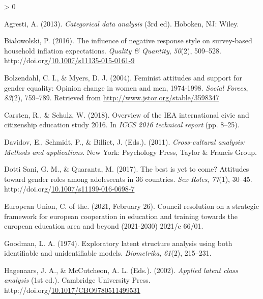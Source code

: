 \documentclass[12pt,a4paper,oneside]{reedthesis}
\newlength{\cslhangindent}
\newenvironment{CSLReferences}[2] %
 {%
  \setlength{\parindent}{0pt}
  \ifodd #1 \everypar{\setlength{\hangindent}{\cslhangindent}}\ignorespaces\fi
  \ifnum #2 > 0
  \setlength{\parskip}{#2\baselineskip}
  \fi
 }%
 {}
\begin{document}
\hypertarget{refs}{}
\begin{CSLReferences}{1}{0}
\leavevmode\hypertarget{ref-agresti_categorical_2013}{}%
Agresti, A. (2013). \emph{Categorical data analysis} (3rd ed). Hoboken, {NJ}: Wiley.

\leavevmode\hypertarget{ref-bialowolski_influence_2016}{}%
Białowolski, P. (2016). The influence of negative response style on survey-based household inflation expectations. \emph{Quality \& Quantity}, \emph{50}(2), 509--528. http://doi.org/\href{https://doi.org/10.1007/s11135-015-0161-9}{10.1007/s11135-015-0161-9}

\leavevmode\hypertarget{ref-bolzendahl_feminist_2004}{}%
Bolzendahl, C. I., \& Myers, D. J. (2004). Feminist attitudes and support for gender equality: Opinion change in women and men, 1974-1998. \emph{Social Forces}, \emph{83}(2), 759--789. Retrieved from \url{http://www.jstor.org/stable/3598347}

\leavevmode\hypertarget{ref-carsten_overview_2018}{}%
Carsten, R., \& Schulz, W. (2018). Overview of the {IEA} international civic and citizenship education study 2016. In \emph{{ICCS} 2016 technical report} (pp. 8--25).

\leavevmode\hypertarget{ref-davidov_cross-cultural_2011}{}%
Davidov, E., Schmidt, P., \& Billiet, J. (Eds.). (2011). \emph{Cross-cultural analysis: Methods and applications}. New York: Psychology Press, Taylor \& Francis Group.

\leavevmode\hypertarget{ref-dotti_sani_best_2017}{}%
Dotti Sani, G. M., \& Quaranta, M. (2017). The best is yet to come? Attitudes toward gender roles among adolescents in 36 countries. \emph{Sex Roles}, \emph{77}(1), 30--45. http://doi.org/\href{https://doi.org/10.1007/s11199-016-0698-7}{10.1007/s11199-016-0698-7}

\leavevmode\hypertarget{ref-council_of_the_european_union_council_2021}{}%
European Union, C. of the. (2021, February 26). Council resolution on a strategic framework for european cooperation in education and training towards the european education area and beyond (2021-2030) 2021/c 66/01.

\leavevmode\hypertarget{ref-goodman_exploratory_1974}{}%
Goodman, L. A. (1974). Exploratory latent structure analysis using both identifiable and unidentifiable models. \emph{Biometrika}, \emph{61}(2), 215--231.

\leavevmode\hypertarget{ref-hagenaars_applied_2002}{}%
Hagenaars, J. A., \& McCutcheon, A. L. (Eds.). (2002). \emph{Applied latent class analysis} (1st ed.). Cambridge University Press. http://doi.org/\href{https://doi.org/10.1017/CBO9780511499531}{10.1017/CBO9780511499531}


\end{CSLReferences}
\end{document}
